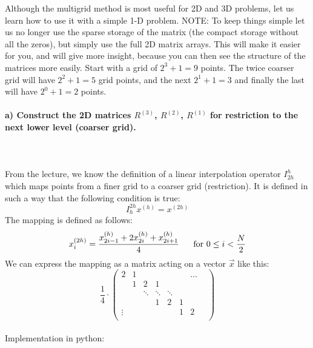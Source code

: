 Although the multigrid method is most useful for 2D and 3D problems, 
let us learn how to use it with a simple 1-D problem.
NOTE: To keep things simple let us no longer use the sparse storage of 
the matrix (the compact storage without all the zeros), but simply use 
the full 2D matrix arrays. This will make it easier for you, and will 
give more insight, because you can then see the structure of the 
matrices more easily.
Start with a grid of $2^3+1=9$ points. The twice coarser grid will have 
$2^2+1=5$ grid points, and the next $2^1+1=3$ and finally the last will 
have $2^0+1=2$ points.

\paragraph{
    a) Construct the 2D matrices $R^{(3)}$, $R^{(2)}$, $R^{(1)}$ 
    for restriction to the next lower level (coarser grid).
} \ \\
    \\
    From the lecture, we know the definition of a linear 
    interpolation operator $I_{2h}^h$ which maps points from 
    a finer grid to a coarser grid (restriction).  It is 
    defined in such a way that the following condition is true:
    \begin{equation}
        I_h^{2h}x^{(h)}=x^{(2h)}
    \end{equation}
    The mapping is defined as follows:
    \begin{equation}
        x_i^{(2h)}=
        \frac{x_{2i-1}^{(h)}+2x_{2i}^{(h)}+x_{2i+1}^{(h)}}{4}
        \ \ \ \ \ 
        \textnormal{for }0\leq i<\frac{N}{2}
    \end{equation}
    We can express the mapping as a matrix acting on a vector 
    $\vec x$ like this:
    \begin{equation}
        \frac{1}{4}\cdot        
        \begin{pmatrix}
            2      & 1 &    &   &        &        & \hdots & \\
                   & 1 & 2  & 1 &        &        &        & \\
                   &   & \ddots & \ddots & \ddots &        & \\
                   &   &        & 1      & 2      & 1      & \\
            \vdots &   &        &        &        & 1      & 2 \\
        \end{pmatrix}
    \end{equation} \ \\
    Implementation in python:
    

